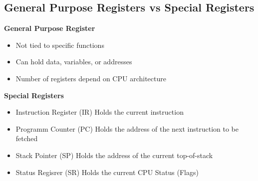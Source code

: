 \subsection{General Purpose Registers vs Special Registers}
\vspace{-0.5cm}
\begin{multicols}{2}
    \begin{minipage}{\linewidth}
        \textbf{General Purpose Register}
        \begin{itemize}
            \item Not tied to specific functions
            \item Can hold data, variables, or addresses
            \item Number of registers depend on CPU architecture
        \end{itemize}
    \end{minipage}
    \begin{minipage}{\linewidth}
        \textbf{Special Registers}
        \begin{itemize}
            \item Instruction Register (IR)
                \subitem Holds the current instruction 
            \item Programm Counter (PC)
                \subitem Holds the address of the next instruction to be fetched
            \item Stack Pointer (SP)
                \subitem Holds the address of the current top-of-stack 
            \item Status Regisrer (SR)
                \subitem Holds the current CPU Status (Flags)
        \end{itemize}
        
    \end{minipage}
\end{multicols}

